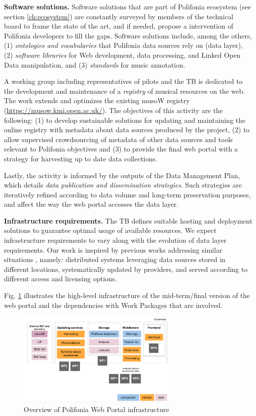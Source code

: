 \textbf{Software solutions.} Software solutions that are part of Polifonia ecosystem (see section \ref{ch:ecosystem}) are constantly surveyed by members of the technical board to frame the state of the art, and if needed, propose a intervention of Polifonia developers to fill the gaps. Software solutions include, among the others, (1) \emph{ontologies and vocabularies} that Polifonia data sources rely on (data layer), (2) \emph{software libraries} for Web development, data processing, and Linked Open Data manipulation, and (3) \emph{standards} for music annotation.

A working group including representatives of pilots and the TB is dedicated to the development and maintenance of a \emph{registry} of musical resources on the web. The work extends and optimizes the existing musoW registry (\url{https://musow.kmi.open.ac.uk/}). The objectives of this activity are the following: (1) to develop sustainable solutions for updating and maintaining the online registry with metadata about data sources produced by the project, (2) to allow supervised crowdsourcing of metadata of other data sources and tools relevant to Polifonia objectives and (3) to provide the final web portal with a strategy for harvesting up to date data collections.

Lastly, the activity is informed by the outputs of the Data Management Plan, which details \emph{data publication and dissemination strategies}. Such strategies are iteratively refined according to data volume and long-term preservation purposes, and affect the way the web portal accesses the data layer. 

\textbf{Infrastructure requirements.} The TB defines suitable hosting and deployment solutions to guarantee optimal usage of available resources. We expect infrastructure requirements to vary along with the evolution of data layer requirements. Our work is inspired by previous works addressing similar situations \cite{kirstein2019european,kirstein2020piveau}, namely: distributed systems leveraging data sources stored in different locations, systematically updated by providers, and served according to different access and licensing options.

Fig. \ref{fig:infrastructure} illustrates the high-level infrastructure of the mid-term/final version of the web portal and the dependencies with Work Packages that are involved.

\begin{figure}
    \centering
    \includegraphics[width=0.7\textwidth]{images/webportal.png}
    \caption{Overview of Polifonia Web Portal infrastructure}
    \label{fig:infrastructure}
\end{figure}

